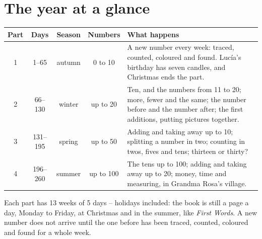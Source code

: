 \section*{The year at a glance}

\begin{center}
\renewcommand{\arraystretch}{1.4}
\begin{tabularx}{\linewidth}{@{}c c c c X@{}}
\toprule
\textbf{Part} & \textbf{Days} & \textbf{Season} & \textbf{Numbers} & \textbf{What happens} \\
\midrule
1 & 1--65 & autumn & 0 to 10 & A new number every week: traced,
counted, coloured and found. Lucía's birthday has seven candles, and
Christmas ends the part. \\
2 & 66--130 & winter & up to 20 & Ten, and the numbers from 11 to 20;
more, fewer and the same; the number before and the number after; the
first additions, putting pictures together. \\
3 & 131--195 & spring & up to 50 & Adding and taking away up to 10;
splitting a number in two; counting in twos, fives and tens; thirteen
or thirty? \\
4 & 196--260 & summer & up to 100 & The tens up to 100; adding and
taking away up to 20; money, time and measuring, in Grandma Rosa's
village. \\
\bottomrule
\end{tabularx}
\end{center}

\vspace{6mm}
Each part has 13 weeks of 5 days -- holidays included: the book is still
a page a day, Monday to Friday, at Christmas and in the summer, like
\emph{First Words}. A new number does not arrive until the one before
has been traced, counted, coloured and found for a whole week.
\newpage
